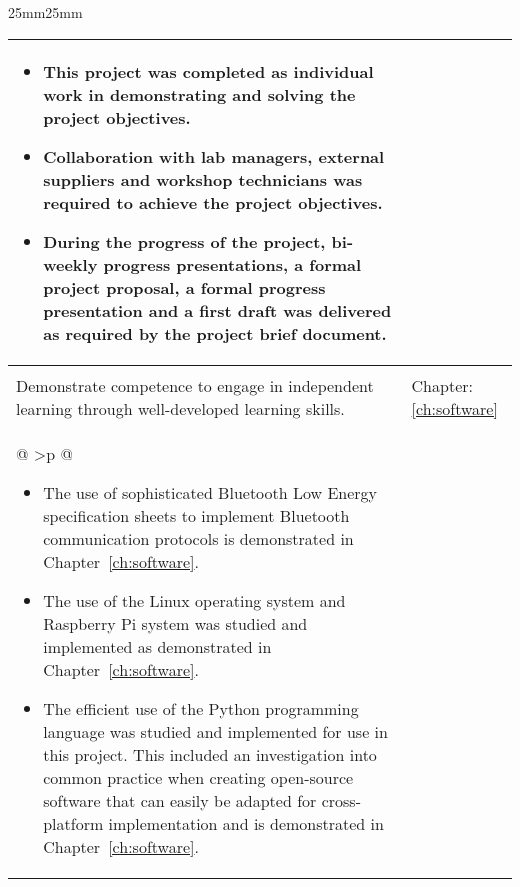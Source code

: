 {\begin{USS@SetMargins}{25mm}{25mm}
\begin{longtable}{@{\extracolsep{\fill}}| >{\raggedright}p{} | >{\raggedright\noindent\arraybackslash}p{32mm} |}
{\begin{itemize}[leftmargin=*]
				\item This project was completed as individual work in demonstrating and solving the project objectives.
				\item Collaboration with lab managers, external suppliers and workshop technicians was required to achieve the project objectives.
				\item During the progress of the project, bi-weekly progress presentations, a formal project proposal, a formal progress presentation and a first draft was delivered as required by the project brief document.
			\end{itemize}
			}                                                                                                                                                                                                                                                                                                              \\
			\hline
			\multicolumn{2}{|>{\small\sffamily\bfseries\columncolor[gray]{.8}}c|}{\capitalisewords{ELO 9: Independent Learning Ability}}                                                                                                                                                                                   \\
			\nobreakhline
			Demonstrate competence to engage in independent learning through well-developed learning skills.
			                                                                                                                                                                 & Chapter:\newline \ref{ch:software}                                                                                                        \\
			\nobreakhline
			\multicolumn{2}
			{@{\hspace{\fill}} >{\small\normalfont\justifying}p{\textwidth} @{\hspace{\fill}}}{
			\begin{itemize}[leftmargin=*]
				\item The use of sophisticated Bluetooth Low Energy specification sheets to implement Bluetooth communication protocols is demonstrated in Chapter~\ref{ch:software}.
				\item The use of the Linux operating system and Raspberry Pi system was studied and implemented as demonstrated in Chapter~\ref{ch:software}.
				\item The efficient use of the Python programming language was studied and implemented for use in this project. This included an investigation into common practice when creating open-source software that can easily be adapted for cross-platform implementation and is demonstrated in Chapter~\ref{ch:software}.
			\end{itemize}
			}
		\end{longtable}
	\end{USS@SetMargins}
	\clearpage
}
\makeatother



